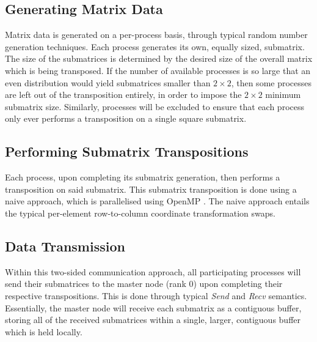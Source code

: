 \documentclass[journal,10pt,a4paper]{IEEEtran}
\begin{document}


\subsection{Generating Matrix Data}

Matrix data is generated on a per-process basis, through typical random number generation techniques. Each process generates its own, equally sized, submatrix. The size of the submatrices is determined by the desired size of the overall matrix which is being transposed. If the number of available processes is so large that an even distribution would yield submatrices smaller than $2 \times 2$, then some processes are left out of the transposition entirely, in order to impose the $2 \times 2$ minimum submatrix size. Similarly, processes will be excluded to ensure that each process only ever performs a transposition on a single square submatrix.



\subsection{Performing Submatrix Transpositions}

Each process, upon completing its submatrix generation, then performs a transposition on said submatrix. This submatrix transposition is done using a naive approach, which is parallelised using OpenMP \cite{omp}. The naive approach entails the typical per-element row-to-column coordinate transformation swaps.

\subsection{Data Transmission}

Within this two-sided communication approach, all participating processes will send their submatrices to the master node (rank 0) upon completing their respective transpositions. This is done through typical \textit{Send} and \textit{Recv} semantics. Essentially, the master node will receive each submatrix as a contiguous buffer, storing all of the received submatrices within a single, larger, contiguous buffer which is held locally.
\end{document}
